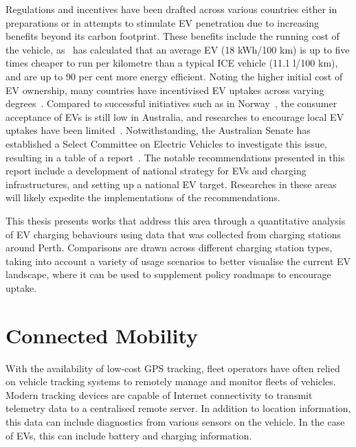 Regulations and incentives have been drafted across various countries either in preparations or in attempts to stimulate EV penetration due to increasing benefits beyond its carbon footprint. These benefits include the running cost of the vehicle, as~\cite{joseph_how_2016} has calculated that an average EV (18 kWh/100 km) is up to five times cheaper to run per kilometre than a typical ICE vehicle (11.1 l/100 km), and are up to 90 per cent more energy efficient. Noting the higher initial cost of EV ownership, many countries have incentivised EV uptakes across varying degrees~\cite{broadbent_electric_2018}. Compared to successful initiatives such as in Norway~\cite{bauer_impact_2018}, the consumer acceptance of EVs is still low in Australia, and researches to encourage local EV uptakes have been limited~\cite{broadbent_analysis_2019}. Notwithstanding, the Australian Senate has established a Select Committee on Electric Vehicles to investigate this issue, resulting in a table of a report~\cite{senate_select_committee_on_electric_vehicles_report_2019}. The notable recommendations presented in this report include a development of national strategy for EVs and charging infrastructures, and setting up a national EV target. Researches in these areas will likely expedite the implementations of the recommendations. 


This thesis presents works that address this area through a quantitative analysis of EV charging behaviours using data that was collected from charging stations around Perth. Comparisons are drawn across different charging station types, taking into account a variety of usage scenarios to better visualise the current EV landscape, where it can be used to supplement policy roadmaps to encourage uptake.  


\section{Connected Mobility}
With the availability of low-cost GPS tracking, fleet operators have often relied on vehicle tracking systems to remotely manage and monitor fleets of vehicles. Modern tracking devices are capable of Internet connectivity to transmit telemetry data to a centralised remote server. In addition to location information, this data can include diagnostics from various sensors on the vehicle. In the case of EVs, this can include battery and charging information. 

